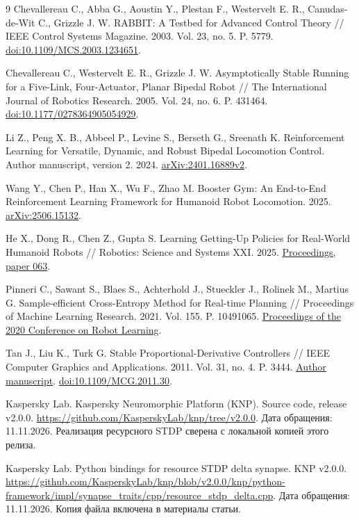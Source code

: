 \documentclass[11pt,a4paper]{article}
\begin{document}
\clearpage
\begin{thebibliography}{9}\small
{}
Chevallereau C., Abba G., Aoustin Y., Plestan F., Westervelt E. R., Canudas-de-Wit C., Grizzle J. W.
RABBIT: A Testbed for Advanced Control Theory // IEEE Control Systems Magazine. 2003. Vol. 23, no. 5. P. 57\textendash{}79.
\href{https://doi.org/10.1109/MCS.2003.1234651}{doi:10.1109/MCS.2003.1234651}.

Chevallereau C., Westervelt E. R., Grizzle J. W.
Asymptotically Stable Running for a Five-Link, Four-Actuator, Planar Bipedal Robot // The International Journal of Robotics Research. 2005. Vol. 24, no. 6. P. 431\textendash{}464.
\href{https://doi.org/10.1177/0278364905054929}{doi:10.1177/0278364905054929}.

Li Z., Peng X. B., Abbeel P., Levine S., Berseth G., Sreenath K.
Reinforcement Learning for Versatile, Dynamic, and Robust Bipedal Locomotion Control. Author manuscript, version 2. 2024.
\href{https://arxiv.org/abs/2401.16889v2}{arXiv:2401.16889v2}.

Wang Y., Chen P., Han X., Wu F., Zhao M.
Booster Gym: An End-to-End Reinforcement Learning Framework for Humanoid Robot Locomotion. 2025.
\href{https://arxiv.org/abs/2506.15132}{arXiv:2506.15132}.

He X., Dong R., Chen Z., Gupta S.
Learning Getting-Up Policies for Real-World Humanoid Robots // Robotics: Science and Systems XXI. 2025.
\href{https://roboticsproceedings.org/rss21/p063.html}{Proceedings, paper 063}.

Pinneri C., Sawant S., Blaes S., Achterhold J., Stueckler J., Rolinek M., Martius G.
Sample-efficient Cross-Entropy Method for Real-time Planning // Proceedings of Machine Learning Research. 2021. Vol. 155. P. 1049\textendash{}1065.
\href{https://proceedings.mlr.press/v155/pinneri21a.html}{Proceedings of the 2020 Conference on Robot Learning}.

Tan J., Liu K., Turk G.
Stable Proportional-Derivative Controllers // IEEE Computer Graphics and Applications. 2011. Vol. 31, no. 4. P. 34\textendash{}44.
\href{https://jie-tan.net/project/spd.pdf}{Author manuscript}.
\href{https://doi.org/10.1109/MCG.2011.30}{doi:10.1109/MCG.2011.30}.

Kaspersky Lab. Kaspersky Neuromorphic Platform (KNP). Source code, release v2.0.0.
\url{https://github.com/KasperskyLab/knp/tree/v2.0.0}.
Дата обращения: 11.11.2026. Реализация ресурсного STDP сверена с локальной копией этого релиза.

Kaspersky Lab. Python bindings for resource STDP delta synapse. KNP v2.0.0.
\url{https://github.com/KasperskyLab/knp/blob/v2.0.0/knp/python-framework/impl/synapse_traits/cpp/resource_stdp_delta.cpp}.
Дата обращения: 11.11.2026. Копия файла включена в материалы статьи.
\end{thebibliography}
\end{document}
